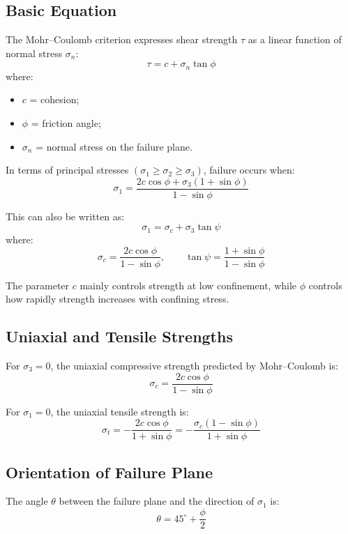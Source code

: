 \documentclass[a4paper,12pt]{article}
\begin{document}
\subsection{Basic Equation}

The Mohr--Coulomb criterion expresses shear strength \(\tau\) as a linear function of
normal stress \(\sigma_n\):
\[
\tau = c + \sigma_n \tan\phi
\]
where:
\begin{itemize}
    \item \(c\) = cohesion;
    \item \(\phi\) = friction angle;
    \item \(\sigma_n\) = normal stress on the failure plane.
\end{itemize}

In terms of principal stresses \((\sigma_1 \geq \sigma_2 \geq \sigma_3)\), failure occurs when:
\[
\sigma_1 =
\frac{2c\cos\phi + \sigma_3(1+\sin\phi)}
{1-\sin\phi}
\]

This can also be written as:
\[
\sigma_1 = \sigma_c + \sigma_3 \tan\psi
\]
where:
\[
\sigma_c =
\frac{2c\cos\phi}{1-\sin\phi},
\qquad
\tan\psi =
\frac{1+\sin\phi}{1-\sin\phi}
\]

\begin{calcbox}
The parameter \(c\) mainly controls strength at low confinement, while \(\phi\) controls
how rapidly strength increases with confining stress.
\end{calcbox}

\subsection{Uniaxial and Tensile Strengths}

For \(\sigma_3 = 0\), the uniaxial compressive strength predicted by Mohr--Coulomb is:
\[
\sigma_c =
\frac{2c\cos\phi}{1-\sin\phi}
\]

For \(\sigma_1 = 0\), the uniaxial tensile strength is:
\[
\sigma_t =
-\frac{2c\cos\phi}{1+\sin\phi}
=
-\frac{\sigma_c(1-\sin\phi)}{1+\sin\phi}
\]

\subsection{Orientation of Failure Plane}

The angle \(\theta\) between the failure plane and the direction of \(\sigma_1\) is:
\[
\theta = 45^\circ + \frac{\phi}{2}
\]
\end{document}
